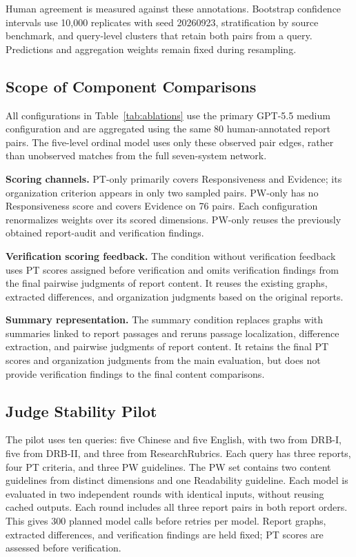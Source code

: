\documentclass{article}
\begin{document}
Human agreement is measured against these annotations. Bootstrap confidence intervals use 10,000 replicates with seed 20260923, stratification by source benchmark, and query-level clusters that retain both pairs from a query. Predictions and aggregation weights remain fixed during resampling. 

\subsection{Scope of Component Comparisons}
\label{app:component_scope}
All configurations in Table~\ref{tab:ablations} use the primary GPT-5.5 medium configuration and are aggregated using the same 80 human-annotated report pairs. The five-level ordinal model uses only these observed pair edges, rather than unobserved matches from the full seven-system network.

\textbf{Scoring channels.}
PT-only primarily covers Responsiveness and Evidence; its organization criterion appears in only two sampled pairs. PW-only has no Responsiveness score and covers Evidence on 76 pairs. Each configuration renormalizes weights over its scored dimensions. PW-only reuses the previously obtained report-audit and verification findings. 

\textbf{Verification scoring feedback.}
The condition without verification feedback uses PT scores assigned before verification and omits verification findings from the final pairwise judgments of report content. It reuses the existing graphs, extracted differences, and organization judgments based on the original reports. 

\textbf{Summary representation.}
The summary condition replaces graphs with summaries linked to report passages and reruns passage localization, difference extraction, and pairwise judgments of report content. It retains the final PT scores and organization judgments from the main evaluation, but does not provide verification findings to the final content comparisons. 

\subsection{Judge Stability Pilot}
\label{app:judge_stability}
The pilot uses ten queries: five Chinese and five English, with two from DRB-I, five from DRB-II, and three from ResearchRubrics. Each query has three reports, four PT criteria, and three PW guidelines. The PW set contains two content guidelines from distinct dimensions and one Readability guideline. Each model is evaluated in two independent rounds with identical inputs, without reusing cached outputs. Each round includes all three report pairs in both report orders. This gives 300 planned model calls before retries per model. Report graphs, extracted differences, and verification findings are held fixed; PT scores are assessed before verification.
\end{document}
